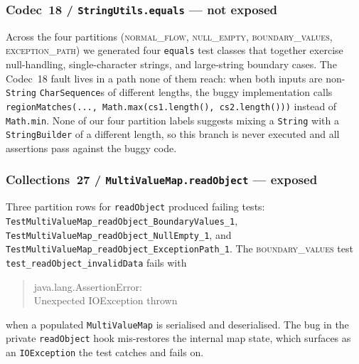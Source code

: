 \documentclass[conference]{IEEEtran}
\begin{document}
\subsubsection*{Codec~18 / \texttt{StringUtils.equals} --- not exposed}
Across the four partitions (\textsc{normal\_flow}, \textsc{null\_empty},
\textsc{boundary\_values}, \textsc{exception\_path}) we generated four
\texttt{equals} test classes that together exercise null-handling,
single-character strings, and large-string boundary cases. The
Codec~18 fault lives in a path none of them reach: when both inputs
are non-\texttt{String} \texttt{Char\-Sequence}s of different lengths,
the buggy implementation calls\\
\texttt{regionMatches(..., Math.max(\linebreak cs1.length(), cs2.length()))}
instead of \texttt{Math.min}. None of our four partition labels
suggests mixing a \texttt{String} with a \texttt{StringBuilder} of a
different length, so this branch is never executed and all assertions
pass against the buggy code.

\subsubsection*{Collections~27 / \texttt{MultiValueMap.\linebreak readObject} --- exposed}
Three partition rows for \texttt{readObject} produced failing tests:
\texttt{TestMultiValueMap\_\linebreak readObject\_BoundaryValues\_1},
\texttt{Test\-MultiValueMap\_\linebreak readObject\_NullEmpty\_1},
and
\texttt{Test\-MultiValueMap\_\linebreak readObject\_ExceptionPath\_1}.
The \textsc{boundary\_values} test
\texttt{test\_readObject\_invalid\-Data} fails with
\begin{quote}\small\ttfamily
java.lang.AssertionError:\\ Unexpected IOException thrown
\end{quote}
when a populated \texttt{MultiValueMap} is serialised and
deserialised. The bug in the private \texttt{readObject} hook
mis-restores the internal map state, which surfaces as an
\texttt{IOException} the test catches and fails on.
\end{document}
